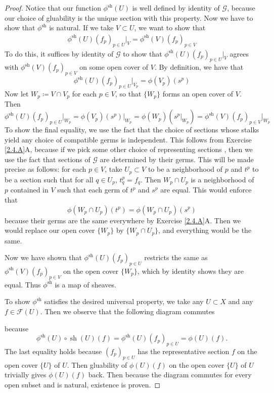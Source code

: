 \documentclass{article}
\newcommand{\fF}{\mathscr{F}}
\newcommand{\fG}{\mathscr{G}}
\DeclareMathOperator{\sh}{sh}
\begin{document}
\begin{proof}
    Notice that our function $\phi^{\sh}(U)$ is well defined by identity of $\fG$, because our choice of gluability is the unique section with this property. Now we have to show that $\phi^{\sh}$ is natural. If we take $V\subset U$, we want to show that
    \begin{align}
        \phi^{\sh}(U)(f_p)_{p\in U}\vert_{V}=\phi^{\sh}(V)(f_p)_{p\in V}
    \end{align}
    To do this, it suffices by identity of $\fG$ to show that $\phi^{\sh}(U)(f_p)_{p\in U}\vert_V$ agrees with $\phi^{\sh}(V)(f_p)_{p\in V}$ on some open cover of $V$. By definition, we have that
    \[
    \phi^{\sh}(U)(f_p)_{p\in U} \vert_{V_p}=\phi(V_p)(s^p)
    \]
    Now let $W_p\coloneqq V\cap V_p$ for each $p\in V$, so that $\{W_p\}$ forms an open cover of $V$. Then
    \[
    \phi^{\sh}(U)(f_p)_{p\in U}\vert_{W_p}=\phi(V_p)(s^p)\vert_{W_p}=\phi(W_p)(s^p\vert_{W_p})=\phi^{\sh}(V)(f_p)_{p\in V} \vert_{W_p}
    \]
    To show the final equality, we use the fact that the choice of sections whose stalks yield any choice of compatible germs is independent. This follows from Exercise \ref{2.4.A}A, because if we pick some other choice of representing sections , then we use the fact that sections of $\fG$ are determined by their germs. This will be made precise as follows: for each $p\in V$, take $U_p\subset V$ to be a neighborhood of $p$ and $t^p$ to be a section such that for all $q\in U_p$, $t^p_q=f_q$. Then $W_p\cap U_p$ is a neighborhood of $p$ contained in $V$ such that each germ of $t^p$ and $s^p$ are equal. This would enforce that
    \[
    \phi(W_p\cap U_p)(t^p)=\phi(W_p\cap U_p)(s^p)
    \]
    because their germs are the same everywhere by Exercise \ref{2.4.A}A. Then we would replace our open cover $\{W_p\}$ by $\{W_p\cap U_p\}$, and everything would be the same.

    Now we have shown that $\phi^{\sh}(U)(f_p)_{p\in U}$ restricts the same as $\phi^{\sh}(V)(f_p)_{p\in V}$ on the open cover $\{W_p\}$, which by identity shows they are equal. Thus $\phi^{\sh}$ is a map of sheaves.

    To show $\phi^{\sh}$ satisfies the desired universal property, we take any $U\subset X$ and any $f\in \fF(U)$. Then we observe that the following diagram commutes
    \begin{center}
    \end{center}
        because
        \[
        \phi^{\sh}(U)\circ \sh(U)(f)= \phi^{\sh}(U)(f_p)_{p\in U}=\phi(U)(f).
        \]
        The last equality holds because $(f_p)_{p\in U}$ has the representative section $f$ on the open cover $\{U\}$ of $U$. Then gluability of $\phi(U)(f)$ on the open cover $\{U\}$ of $U$ trivially gives $\phi(U)(f)$ back. Then because the diagram commutes for every open subset and is natural, existence is proven.
        

\end{proof}
\end{document}
